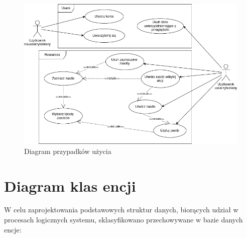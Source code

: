 \begin{figure}[!htbp] 
    \centering
    \includegraphics[width=\textwidth]{img/chapter4/open-osp.uml-diagrams-use-case.png}
    \caption{Diagram przypadków użycia}
    \label{fig:uml.use-case}
\end{figure}

\section{Diagram klas encji}

W celu zaprojektowania podstawowych struktur danych, biorących udział w procesach logicznych systemu, sklasyfikowano przechowywane w bazie danych encje:

